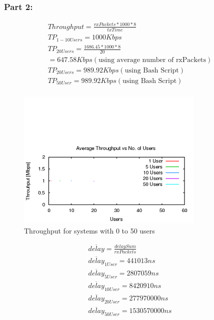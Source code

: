 \subsubsection{Part 2:}

\begin{gather*}
	Throughput=\frac{rxPackets*1000*8}{txTime} \\
	TP_{1-10 Users}= 1000Kbps\\
	TP_{20 Users}= \frac{1686.45*1000*8}{20}\\
	= 647.58Kbps (\text{using average number of rxPackets}) \\
	TP_{20 Users} = 989.92Kbps (\text{using Bash Script}) \\
	TP_{50 User}= 989.92Kbps (\text{using Bash Script}) \\
\end{gather*}

\begin{figure}[H]
	\centering
	\includegraphics[width=0.8\textwidth]{images/EE500/QC/P2/Images/wifi-throughput}
	\caption{Throughput for systems with 0 to 50 users}
	\label{fig:QCP2throughput}
\end{figure}

\begin{gather*}
	\overline{delay}=\frac{delaySum}{rxPackets} \\
	\overline{delay}_{1 User}=441013ns \\
	\overline{delay}_{5 User}=2807059ns \\
	\overline{delay}_{10 User}=8420910ns \\
	\overline{delay}_{20 User}=277970000ns \\
	\overline{delay}_{50 User}=1530570000ns \\
\end{gather*}

